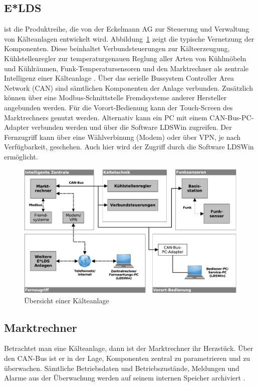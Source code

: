 \documentclass[11pt,a4paper]{report}
\begin{document}
\subsection{E*LDS} ist die Produktreihe, die von der Eckelmann AG zur Steuerung und Verwaltung von Kälteanlagen entwickelt wird. Abbildung~\ref{fig:kaelteanlage} zeigt die typische Vernetzung der Komponenten. Diese beinhaltet Verbundsteuerungen zur Kälteerzeugung, Kühlstellenregler zur temperaturgenauen Reglung aller Arten von Kühlmöbeln und Kühlräumen, Funk-Temperatursensoren und den Marktrechner als zentrale Intelligenz einer Kälteanlage \cite{elds}. Über das serielle Bussystem Controller Area Network (CAN) sind sämtlichen Komponenten der Anlage verbunden. Zusätzlich können über eine Modbus-Schnittstelle Fremdsysteme anderer Hersteller angebunden werden. Für die Vorort-Bedienung kann der Touch-Screen des Marktrechners genutzt werden. Alternativ kann ein PC mit einem CAN-Bus-PC-Adapter verbunden werden und über die Software LDSWin zugreifen. Der Fernzugriff kann über eine Wählverbinung (Modem) oder über VPN, je nach Verfügbarkeit, geschehen. Auch hier wird der Zugriff durch die Software LDSWin ermöglicht.

\begin{figure}[htbp]
\centering
\includegraphics[scale=0.65]{images/kaelteanlage_uebersicht.pdf}
\caption{Übersicht einer Kälteanlage}
\label{fig:kaelteanlage}
\end{figure}

\subsection{Marktrechner} \label{sec:marktrechner} 
Betrachtet man eine Kälteanlage, dann ist der Marktrechner ihr Herzstück. Über den CAN-Bus ist er in der Lage, Komponenten zentral zu parametrieren und zu überwachen. Sämtliche Betriebsdaten und Betriebszustände, Meldungen und Alarme aus der Überwachung werden auf seinem internen Speicher archiviert \cite{elds}.
\end{document}
